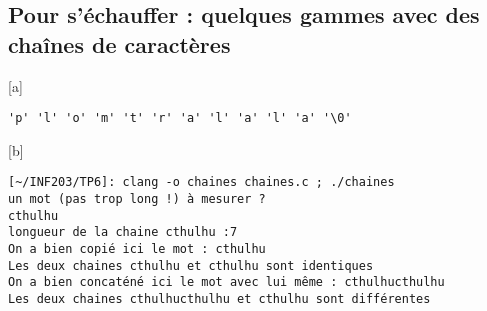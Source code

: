 \documentclass[12pt,a4paper,notitlepage,colorinlistoftodos]{article}
\begin{document}

\subsection*{Pour s'échauffer : quelques gammes avec des chaînes de caractères}


[a] 
\begin{lstlisting}
'p' 'l' 'o' 'm' 't' 'r' 'a' 'l' 'a' 'l' 'a' '\0'
\end{lstlisting}


[b]
\begin{lstlisting}
[~/INF203/TP6]: clang -o chaines chaines.c ; ./chaines 
un mot (pas trop long !) à mesurer ?
cthulhu
longueur de la chaine cthulhu :7
On a bien copié ici le mot : cthulhu 
Les deux chaines cthulhu et cthulhu sont identiques
On a bien concaténé ici le mot avec lui même : cthulhucthulhu 
Les deux chaines cthulhucthulhu et cthulhu sont différentes
\end{lstlisting}
\end{document}
